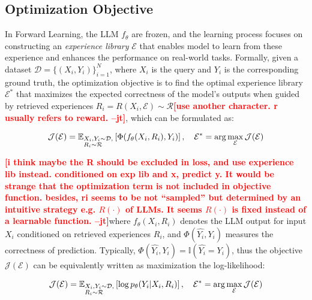 \documentclass{article}
\newcommand{\method}{Forward Learning}
\newcommand{\jiangtao}[1]{\textcolor{red}{\bf \small [#1 --jt]}}
\begin{document}
\subsection{Optimization Objective}
In \method{}, the LLM $f_\theta$ are frozen, and the learning process focuses on constructing an \emph{experience library} $\mathcal{E}$ that enables model to learn from these experience and enhances the performance on real-world tasks. 
Formally, given a dataset $\mathcal{D} = \{(X_i, Y_i)\}^N_{i=1}$, where $X_i$ is the query and $Y_i$ is the corresponding ground truth, the optimization objective is to find the optimal experience library $\mathcal{E}^*$ that maximizes the expected correctness of the model's outputs when guided by retrieved experiences $R_i=R(X_i, \mathcal{E})\sim\mathcal{R}$\jiangtao{use another character. r usually refers to reward.}, which can be formulated as:

\begin{equation}
\mathcal{J}(\mathcal{E}) = \mathbb{E}_{\begin{subarray}{l}
X_i,Y_i\sim\mathcal{D},\\
R_i\sim\mathcal{R}
\end{subarray}}\left[\Phi (f_{\theta}(X_i,R_i), Y_i)\right],\  \  \  \mathcal{E}^* = \arg\max_{\mathcal{E}}\mathcal{J}(\mathcal{E})
\label{obj1}
\end{equation}

\jiangtao{i think maybe the R should be excluded in loss, and use experience lib instead. conditioned on exp lib and x, predict y. It would be strange that the optimization term is not included in objective function. besides, ri seems to be not ``sampled'' but determined by an intuitive strategy e.g. $R(\cdot)$ of LLMs. It seems $R(\cdot)$ is fixed instead of a learnable function.}where $f_\theta(X_i, R_i)$ denotes the LLM output for input $X_i$ conditioned on retrieved experiences $R_i$, and $\Phi(\hat{Y_i}, Y_i)$ measures the correctness of prediction. Typically, $\Phi(\hat{Y_i},Y_i) = \mathbb{I}(\hat{Y_i}\!=\!Y_i)$, thus the objective $\mathcal{J}(\mathcal{E})$ can be equivalently written as maximization the log-likelihood:

\begin{equation}
\mathcal{J}(\mathcal{E}) = \mathbb{E}_{\begin{subarray}{l}
X_i,Y_i\sim\mathcal{D},\\
R_i\sim\mathcal{R}
\end{subarray}}\left[\log p_{\theta}(Y_i|X_i,R_i)\right],\  \  \  \mathcal{E}^* = \arg\max_{\mathcal{E}}\mathcal{J}(\mathcal{E})
\end{equation}
\end{document}
